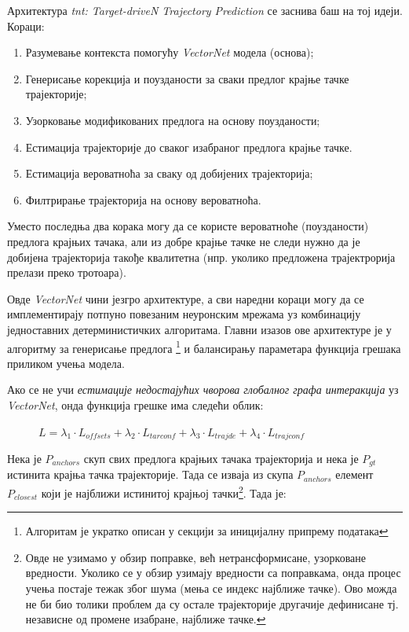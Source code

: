\documentclass[11pt,oneside]{memoir}
\begin{document}
Архитектура \textit{tnt: Target-driveN Trajectory Prediction} \cite{tnt} се заснива баш на тој идеји. Кораци:
\begin{enumerate}
  \item Разумевање контекста помогућу \textit{VectorNet} модела (основа);
  \item Генерисање корекција и поузданости за сваки предлог крајње тачке трајекторије;
  \item Узорковање модификованих предлога на основу поузданости;
  \item Естимација трајекторије до сваког изабраног предлога крајње тачке.
  \item Естимација вероватноћа за сваку од добијених трајекторија;
  \item Филтрирање трајекторија на основу вероватноћа.
\end{enumerate}

Уместо последња два корака могу да се користе вероватноће (поузданости) предлога крајњих тачака, али из добре крајње тачке не следи
нужно да је добијена трајекторија такође квалитетна (нпр. уколико предложена трајектрорија прелази преко тротоара). 

Овде \textit{VectorNet} чини језгро архитектуре, а сви наредни кораци могу да се имплементирају потпуно повезаним неуронским мрежама уз комбинацију
једноставних детерминистичких алгоритама. Главни изазов ове архитектуре је у алгоритму за генерисање предлога
\footnote{Алгоритам је укратко описан у секцији за иницијалну припрему података} и балансирању
параметара функција грешака приликом учења модела.

\noindent Ако се не учи \textit{естимације недостајућих чворова глобалног графа интеракција} уз \textit{VectorNet}, 
онда функција грешке има следећи облик:

\begin{figure}[H]
  \centering
  $L = \lambda_{1} \cdot L_{offsets} + \lambda_{2} \cdot L_{tarconf} + \lambda_{3} \cdot L_{trajde} + \lambda_{4} \cdot L_{trajconf}$
\end{figure}

Нека је $P_{anchors}$ скуп свих предлога крајњих тачака трајекторија и нека је $P_{gt}$ истинита крајња тачка трајекторије. Тада се изваја
из скупа $P_{anchors}$ елемент $P_{closest}$ који је најближи истинитој крајњој тачки\footnote{Овде не узимамо у обзир поправке, 
већ нетрансформисане, узорковане вредности. 
Уколико се у обзир узимају вредности са поправкама, онда процес учења постаје тежак због шума (мења се индекс најближе тачке). Ово можда не би био
толики проблем да су остале трајекторије другачије дефинисане тј. независне од промене изабране, најближе тачке.}. 
Тада је:
\end{document}
